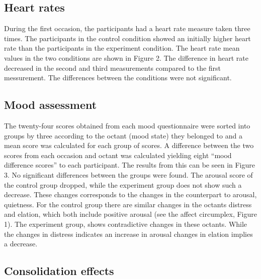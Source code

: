 \documentclass[jou,draftfirst,11pt]{apa6}
\begin{document}
\subsection{Heart rates}

During the first occasion, the participants had a heart rate measure
taken three times. The participants in the control condition showed an
initially higher heart rate than the participants in the experiment
condition. The heart rate mean values in the two conditions are shown
in Figure 2.  The difference in heart rate decreased in the second and
third measurements compared to the first messurement.  The differences
between the conditions were not significant.

\subsection{Mood assessment}

The twenty-four scores obtained from each mood questionnaire  were
sorted into groups by three according to the octant (mood state) they
belonged to and a mean score was calculated for each group of scores.
A difference between the two scores from each occasion and octant was
calculated yielding eight ``mood difference scores'' to each
participant.  The results from this can be seen in Figure 3.  No
significant differences between the groups were found.  The arousal
score of the control group dropped, while the experiment group does
not show such a decrease. These changes corresponds to the changes in
the counterpart to arousal, quietness.  For the control group there
are similar changes in the octants distress and elation, which both
include positive arousal (see the affect circumplex, Figure 1). The
experiment group, shows contradictive changes in these octants. While
the changes in distress indicates an increase in arousal changes in
elation implies a decrease.




\subsection{Consolidation effects}




\end{document}
